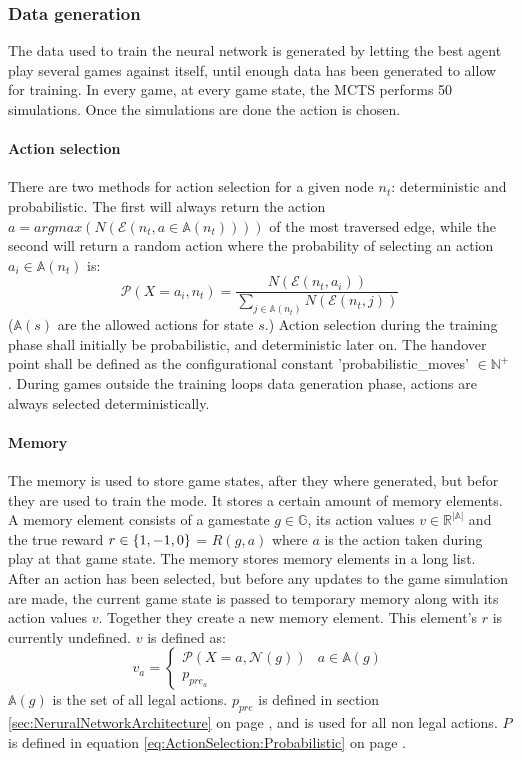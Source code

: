\documentclass[12pt]{article}
\newcommand{\equationref}[1]{equation \ref{#1} on page \pageref{#1}}
\newcommand{\sectionref}[1]{section \ref{#1} on page \pageref{#1}}
\begin{document}
\subsubsection{Data generation}
The data used to train the neural network is generated by letting the best agent play several games against itself, until enough data has been generated to allow for training. In every game, at every game state, the MCTS performs 50 simulations. Once the simulations are done the action is chosen.
\paragraph{Action selection}\label{sec:training:actionSelection}
There are two methods for action selection for a given node \(n_t\): deterministic and probabilistic. The first will always return the action \(a = argmax(N(\mathcal{E}(n_t, a \in \mathbb A(n_t))))\) of the most traversed edge, while the second will return a random action where the probability of selecting an action \(a_i \in \mathbb A(n_t)\) is:
\begin{equation} \label{eq:ActionSelection:Probabilistic}
\mathcal P(X=a_i, n_t) = \frac{N(\mathcal{E}(n_t, a_i))}{\sum_{j \in \mathbb A(n_t)} N(\mathcal{E}(n_t, j))}
\end{equation}
(\(\mathbb A(s)\) are the allowed actions for state \(s\).) Action selection during the training phase shall initially be probabilistic, and deterministic later on. The handover point shall be defined as the configurational constant 'probabilistic\_moves' \(\in \mathbb N^+\). During games outside the training loops data generation phase, actions are always selected deterministically.
 \paragraph{Memory}
\label{sec:memory}
The memory is used to store game states, after they where generated, but befor they are used to train the mode.
It stores a certain amount of memory elements. A memory element consists of a gamestate \(g \in \mathbb G\), its action values \(v \in \mathbb R^{|\mathbb A|}\) and the true reward \(r \in \mathbb \{1, -1, 0\}\) = \(R(g, a)\) where \(a\) is the action taken during play at that game state. The memory stores memory elements in a long list. After an action has been selected, but before any updates to the game simulation are made, the current game state is passed to temporary memory along with its action values \(v\). Together they create a new memory element. This element's \(r\) is currently undefined. \(v\) is defined as: 
\begin{equation} \label{eq:Memory:ActionValuesDefinition}
v_a = 
\begin{cases}
\mathcal P(X=a, \mathcal N(g)) & a \in \mathbb A(g)\\
p_{pre_a} &
\end{cases}
\end{equation}
\(\mathbb A(g)\) is the set of all legal actions. \(p_{pre}\) is defined in \sectionref{sec:NeruralNetworkArchitecture}, and is used for all non legal actions. \(P\) is defined in \equationref{eq:ActionSelection:Probabilistic}.
\end{document}
